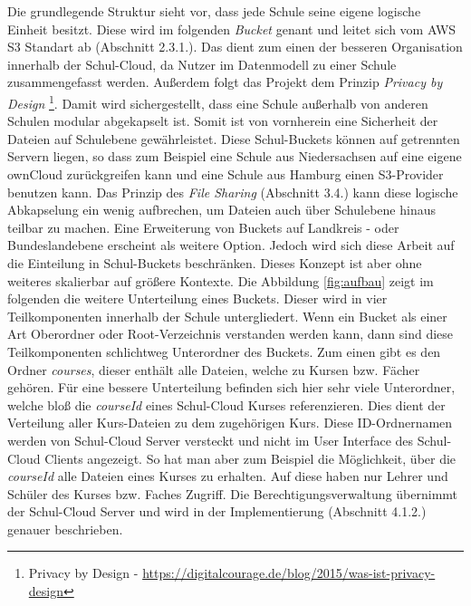 Die grundlegende Struktur sieht vor, dass jede Schule seine eigene logische Einheit besitzt. Diese wird im folgenden \textit{Bucket} genant und leitet sich vom AWS S3 Standart ab (Abschnitt 2.3.1.). Das dient zum einen der besseren Organisation innerhalb der Schul-Cloud, da Nutzer im Datenmodell zu einer Schule zusammengefasst werden. Außerdem folgt das Projekt dem Prinzip \textit{Privacy by Design} \footnote{Privacy by Design - \url{https://digitalcourage.de/blog/2015/was-ist-privacy-design} }. Damit wird sichergestellt, dass eine Schule außerhalb von anderen Schulen modular abgekapselt ist. Somit ist von vornherein  eine Sicherheit der Dateien auf Schulebene gewährleistet. Diese Schul-Buckets können auf getrennten Servern liegen, so dass zum Beispiel eine Schule aus Niedersachsen auf eine eigene ownCloud zurückgreifen kann und eine Schule aus Hamburg einen S3-Provider benutzen kann. Das Prinzip des \textit{File Sharing} (Abschnitt 3.4.) kann diese logische Abkapselung ein wenig aufbrechen, um Dateien auch über Schulebene hinaus teilbar zu machen. Eine Erweiterung von Buckets auf Landkreis - oder Bundeslandebene erscheint als weitere Option. Jedoch wird sich diese Arbeit auf die Einteilung in Schul-Buckets beschränken. Dieses Konzept ist aber ohne weiteres skalierbar auf größere Kontexte.  Die Abbildung \ref{fig:aufbau} zeigt im folgenden die weitere Unterteilung eines Buckets. Dieser wird in vier Teilkomponenten innerhalb der Schule  untergliedert. Wenn ein Bucket als einer Art Oberordner oder Root-Verzeichnis verstanden werden kann, dann sind diese Teilkomponenten schlichtweg Unterordner des Buckets. Zum einen gibt es den Ordner \textit{courses}, dieser enthält alle Dateien, welche zu Kursen bzw. Fächer gehören. Für eine bessere Unterteilung befinden sich hier sehr viele Unterordner, welche bloß die \textit{courseId} eines Schul-Cloud Kurses referenzieren. Dies dient der Verteilung aller Kurs-Dateien zu dem zugehörigen Kurs. Diese ID-Ordnernamen werden von Schul-Cloud Server versteckt und nicht im User Interface des Schul-Cloud Clients angezeigt. So hat man aber zum Beispiel die Möglichkeit, über die \textit{courseId} alle Dateien eines Kurses zu erhalten. Auf diese haben nur Lehrer und Schüler des Kurses bzw. Faches Zugriff. Die Berechtigungsverwaltung übernimmt der Schul-Cloud Server und wird in der Implementierung (Abschnitt 4.1.2.) genauer beschrieben. \\

